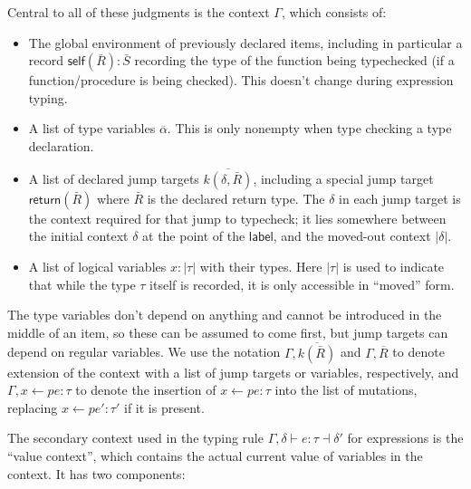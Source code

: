 \documentclass[acmsmall,nonacm]{acmart}
\newcommand{\core}[1]{\left| #1 \right|}
\newcommand{\proves}{\vdash}
\newcommand{\makes}{\dashv}
\begin{document}
Central to all of these judgments is the context $\Gamma$, which consists of:
\begin{itemize}
  \item The global environment of previously declared items, including in particular a record $\mathsf{self}(\bar R):\bar S$ recording the type of the function being typechecked (if a function/procedure is being checked). This doesn't change during expression typing.
  \item A list of type variables $\overline{\alpha}$. This is only nonempty when type checking a type declaration.
  \item A list of declared jump targets $\overline{k(\delta,\bar{R})}$, including a special jump target $\mathsf{return}(\bar{R})$ where $\bar{R}$ is the declared return type. The $\delta$ in each jump target is the context required for that jump to typecheck; it lies somewhere between the initial context $\delta$ at the point of the $\mathsf{label}$, and the moved-out context $\core{\delta}$.
  \item A list of logical variables $x:\core{\tau}$ with their types. Here $\core{\tau}$ is used to indicate that while the type $\tau$ itself is recorded, it is only accessible in ``moved'' form.
\end{itemize}

The type variables don't depend on anything and cannot be introduced in the middle of an item, so these can be assumed to come first, but jump targets can depend on regular variables. We use the notation $\Gamma,\overline{k(\bar{R})}$ and $\Gamma,\overline{R}$ to denote extension of the context with a list of jump targets or variables, respectively, and $\Gamma,x\gets pe:\tau$ to denote the insertion of $x\gets pe:\tau$ into the list of mutations, replacing $x\gets pe':\tau'$ if it is present.

The secondary context used in the typing rule $\Gamma,\delta \proves e:\tau \makes\delta'$ for expressions is the ``value context'', which contains the actual current value of variables in the context. It has two components:
\end{document}
